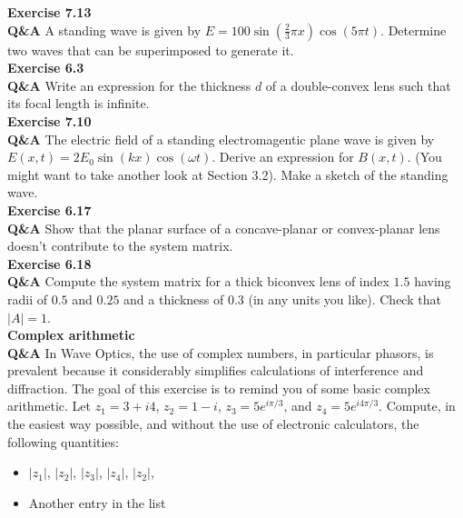 \documentclass[main.tex]{subfiles}
\begin{document}
\textbf{Exercise 7.13}\\
\textbf{Q\&A} A standing wave is given by $E=100\sin(\frac{2}{3}\pi x) \cos( 5\pi t)$. Determine two waves that can be superimposed to generate it.\\

\textbf{Exercise 6.3}\\
\textbf{Q\&A} Write an  expression for the thickness $d$ of a double-convex lens such that its focal length is infinite.\\

\textbf{Exercise 7.10}\\
\textbf{Q\&A} The electric field of a standing electromagentic plane wave is given by $E(x,t) = 2E_0 \sin (kx) \cos(\omega t)$. Derive an expression for $B(x,t)$. (You might want to take another look at Section 3.2). Make a sketch of the standing wave.\\

\textbf{Exercise 6.17}\\
\textbf{Q\&A} Show that the planar surface of a concave-planar or convex-planar lens doesn't contribute to the system matrix.\\

\textbf{Exercise 6.18}\\
\textbf{Q\&A} Compute the system matrix for a thick biconvex lens of index $1.5$ having radii of $0.5$ and $0.25$ and a thickness of $0.3$ (in any units you like). Check that $|A| = 1$.\\

\textbf{Complex arithmetic}\\
\textbf{Q\&A} In Wave Optics, the use of complex numbers, in particular phasors, is prevalent because it considerably simplifies calculations of interference and diffraction. The goal of this exercise is to remind you of some basic complex arithmetic. Let $z_1 = 3 + i4$, $z_2 = 1-i$, $z_3 = 5e^{i\pi /3}$, and $z_4=5e^{i4\pi/3}$. Compute, in the easiest way possible, and without the use of electronic calculators, the following quantities:

\begin{itemize}
  \item $|z_1|$, $|z_2|$, $|z_3|$, $|z_4|$, $|z_2|$,
  \item Another entry in the list
\end{itemize}
\end{document}
